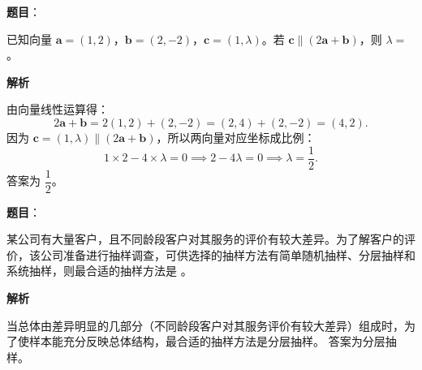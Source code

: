 \begin{answer}

\textbf{题目}：

已知向量 $\boldsymbol a = (1, 2)$，$\boldsymbol b = (2, -2)$，$\boldsymbol c = (1, \lambda)$。若 $\boldsymbol c \parallel (2\boldsymbol a + \boldsymbol b)$，则 $\lambda =$ \underline{\hspace{2cm}}。

\textbf{解析}

由向量线性运算得：
\nopagebreak[4]
\[2\boldsymbol a + \boldsymbol b = 2(1, 2) + (2, -2) = (2, 4) + (2, -2) = (4, 2).\]
因为 $\boldsymbol c = (1, \lambda) \parallel (2\boldsymbol a + \boldsymbol b)$，所以两向量对应坐标成比例：
\nopagebreak[4]
\[1\times 2 - 4\times \lambda = 0 \implies 2 - 4\lambda = 0 \implies \lambda = \dfrac12.\]
答案为 $\dfrac12$。


\end{answer}
\begin{answer}

\textbf{题目}：

某公司有大量客户，且不同龄段客户对其服务的评价有较大差异。为了解客户的评价，该公司准备进行抽样调查，可供选择的抽样方法有简单随机抽样、分层抽样和系统抽样，则最合适的抽样方法是 \underline{\hspace{2cm}}。

\textbf{解析}

当总体由差异明显的几部分（不同龄段客户对其服务评价有较大差异）组成时，为了使样本能充分反映总体结构，最合适的抽样方法是分层抽样。
答案为分层抽样。


\end{answer}
